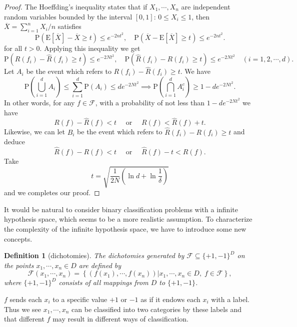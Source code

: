 \documentclass{report}
\newtheorem{definition}{Definition}[chapter]
\theoremstyle{nonumberplain}
\newtheorem{proof}{Proof.}
\newcommand{\0}{\mathbf{0}}
\begin{document}
\begin{proof} The Hoeffding's inequality states that if $X_1,\cdots, X_n$ are independent random variables bounded by the interval $[0, 1]$: $0 \le X_i \le 1$, then $\overline{X}=\sum_{i=1}^{n}X_i/n$ satisfies
\[
\mathrm{P}(\mathrm{E}[\overline{X}]-\overline{X} \geq t) \leq  e^{-2 n t^{2}},\quad\mathrm{P}(\overline{X}-\mathrm{E}[\overline{X}] \geq t) \leq  e^{-2 n t^{2}}.
\]
for all $t>0$. Applying this inequality we get
\[
\mathrm{P}\left(R(f_i)-\widehat{R}(f_i) \ge t\right) \leq  e^{-2 N t^{2}},\quad\mathrm{P}\left(\widehat{R}(f_i)-R(f_i) \ge t\right) \leq  e^{-2 N t^{2}}\quad(i=1,2,\cdots,d).
\]
Let $A_i$ be the event which refers to $R(f_i)-\widehat{R}(f_i) \ge t$. We have
\[
\mathrm{P}\left(\bigcup_{i=1}^d A_i\right)\le \sum_{i=1}^d\mathrm{P}\left( A_i\right)\le de^{-2 N t^{2}}
\implies \mathrm{P}\left(\bigcap_{i=1}^d A_i^c\right)\ge 1- de^{-2 N t^{2}}.
\]
In other words, for any $f\in \mathcal{F}$, with a probability of not less than $1- de^{-2 N t^{2}}$ we have
\[
R(f) - \widehat{R}(f)<t \quad\text{ or }\quad R(f) < \widehat{R}(f)+t.
\]
Likewise, we can let $B_i$ be the event which refers to $\widehat{R}(f_i)-R(f_i) \ge t$ and deduce
\[
\widehat{R}(f) -R(f) <t \quad\text{ or }\quad  \widehat{R}(f)-t<R(f) .
\]
Take
\[
t=\sqrt{\frac{1}{2 N}\left(\ln d+\ln \frac{1}{\delta}\right)}
\]
and we completes our proof.
\end{proof}

It would be natural to consider binary classification problems with a infinite hypothesis space, which seems to be a more realistic assumption. To characterize the complexity of the infinite hypothesis space, we have to introduce some new concepts.

\begin{definition}[dichotomies]
	The \emph{dichotomies} generated by $\mathcal{F}\subseteq\{+1,-1\}^D$ on the points $x_{1}, \cdots, x_{n}\in D$ are defined by
	\[
	\mathcal{F}\left({x}_{1}, \cdots, {x}_{n}\right)=\left\{\left(f\left({x}_{1}\right), \cdots, f\left({x}_{n}\right)\right) |x_{1}, \cdots, x_{n}\in D,\; f \in \mathcal{F}\right\},
	\]
	where $\{+1,-1\}^D$ consists of all mappings from $D$ to $\{+1,-1\}$.
\end{definition}

$f$ sends each $x_i$ to a specific value $+1$ or $-1$ as if it endows each $x_i$ with a label. Thus we see $x_{1}, \cdots, x_{n}$ can be classified into two categories by these labels and that different $f$ may result in different ways of classification.
\end{document}
